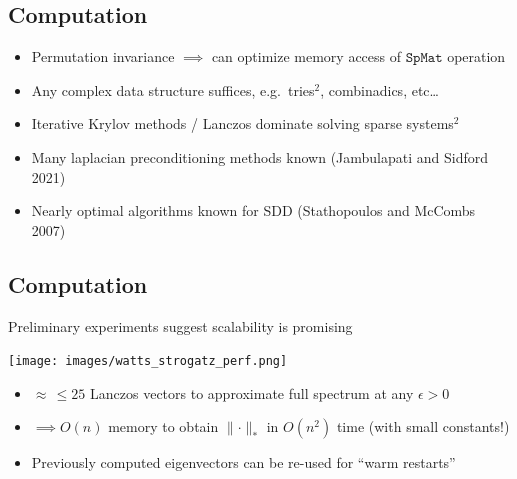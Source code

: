 \documentclass[
  letterpaper,
  DIV=11,
  numbers=noendperiod,
  oneside]{scrartcl}
\providecommand{\tightlist}{%
  \setlength{\itemsep}{0pt}\setlength{\parskip}{0pt}}\usepackage{longtable,booktabs,array}
\begin{document}
\subsection{Computation}\label{computation}

\begin{itemize}
\tightlist
\item
  Permutation invariance \(\implies\) can optimize memory access of
  \(\mathtt{SpMat}\) operation
\end{itemize}

\begin{itemize}
\tightlist
\item
  Any complex data structure suffices, e.g.~tries\(^2\), combinadics,
  etc\ldots{}
\end{itemize}

\begin{itemize}
\tightlist
\item
  Iterative Krylov methods / Lanczos dominate solving sparse
  systems\(^2\)
\end{itemize}

\begin{itemize}
\tightlist
\item
  Many laplacian preconditioning methods known (Jambulapati and Sidford
  2021)
\end{itemize}

\begin{itemize}
\tightlist
\item
  Nearly optimal algorithms known for SDD (Stathopoulos and McCombs
  2007)
\end{itemize}


\subsection{Computation}\label{computation-1}

Preliminary experiments suggest scalability is promising

\texttt{[image: images/watts\_strogatz\_perf.png]}

\begin{itemize}
\tightlist
\item
  \(\approx \, \leq 25\) Lanczos vectors to approximate full spectrum at
  any \(\epsilon > 0\)
\item
  \(\implies O(n)\) memory to obtain \(\lVert \cdot \rVert_\ast\) in
  \(O(n^2)\) time (with small constants!)
\item
  Previously computed eigenvectors can be re-used for ``warm restarts''
\end{itemize}
\end{document}
